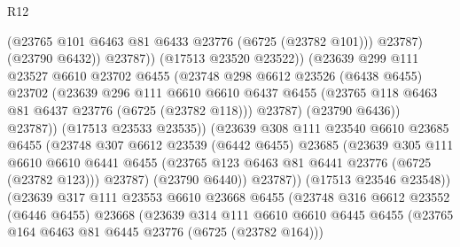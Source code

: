 \begin{lexlean}{R12}
\begin{coremodule}
{{{{{{{{{{{{{{{{{{{{{{{{{{{{{{{{{{{{{{{{{{{{{{{{{{{{{{{{{{{{{{{{{{{{{{{{{{{{{{{{{{                                  (@23765 @101 @6463 @81 @6433 @23776 (@6725 (@23782 @101)))
                                  @23787)
                                (@23790 @6432))
                              @23787))
                          (@17513 @23520 @23522))
                        (@23639
                          @299
                          @111
                          @23527
                          @6610
                          @23702
                          @6455
                          (@23748
                            @298
                            @6612
                            @23526
                            (@6438 @6455)
                            @23702
                            (@23639
                              @296
                              @111
                              @6610
                              @6610
                              @6437
                              @6455
                              (@23765 @118 @6463 @81 @6437 @23776 (@6725 (@23782 @118)))
                              @23787)
                            (@23790 @6436))
                          @23787))
                      (@17513 @23533 @23535))
                    (@23639
                      @308
                      @111
                      @23540
                      @6610
                      @23685
                      @6455
                      (@23748
                        @307
                        @6612
                        @23539
                        (@6442 @6455)
                        @23685
                        (@23639
                          @305
                          @111
                          @6610
                          @6610
                          @6441
                          @6455
                          (@23765 @123 @6463 @81 @6441 @23776 (@6725 (@23782 @123)))
                          @23787)
                        (@23790 @6440))
                      @23787))
                  (@17513 @23546 @23548))
                (@23639
                  @317
                  @111
                  @23553
                  @6610
                  @23668
                  @6455
                  (@23748
                    @316
                    @6612
                    @23552
                    (@6446 @6455)
                    @23668
                    (@23639
                      @314
                      @111
                      @6610
                      @6610
                      @6445
                      @6455
                      (@23765 @164 @6463 @81 @6445 @23776 (@6725 (@23782 @164)))
}}}}}}}}}}}}}}}}}}}}}}}}}}}}}}}}}}}}}}}}}}}}}}}}}}}}}}}}}}}}}}}}}}}}}}}}}}}}}}}}}}
\end{coremodule}
\end{lexlean}
